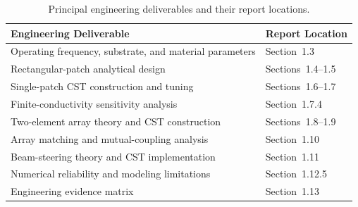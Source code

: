 \begin{table}[htbp]
    \centering
    \caption{Principal engineering deliverables and their report locations.}
    \label{tab:project-deliverables}
    \small
    \renewcommand{\arraystretch}{1.15}
    \begin{tabularx}{0.94\textwidth}{@{}>{\raggedright\arraybackslash}X
        >{\raggedright\arraybackslash}p{}@{}}
        \toprule
        \textbf{Engineering Deliverable} & \textbf{Report Location} \\
        \midrule
        Operating frequency, substrate, and material parameters & Section~1.3 \\
        Rectangular-patch analytical design & Sections~1.4--1.5 \\
        Single-patch CST construction and tuning & Sections~1.6--1.7 \\
        Finite-conductivity sensitivity analysis & Section~1.7.4 \\
        Two-element array theory and CST construction & Sections~1.8--1.9 \\
        Array matching and mutual-coupling analysis & Section~1.10 \\
        Beam-steering theory and CST implementation & Section~1.11 \\
        Numerical reliability and modeling limitations & Section~1.12.5 \\
        Engineering evidence matrix & Section~1.13 \\
        \bottomrule
    \end{tabularx}
\end{table}
